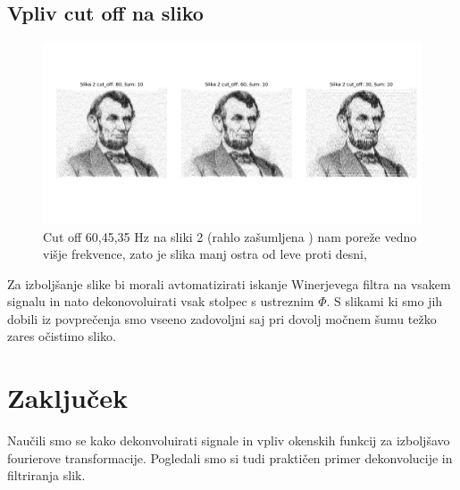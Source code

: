 \documentclass[11pt, a4paper]{article}
\begin{document}
\subsection{Vpliv cut off na sliko}
\begin{figure}[H]
\includegraphics[width=16cm, ]{tretja_tretji2.png}

\caption{Cut off {60,45,35 Hz} na sliki 2 (rahlo zašumljena ) nam poreže vedno višje frekvence, zato je slika manj ostra od leve proti desni, }  
\end{figure}
Za izboljšanje slike bi morali avtomatizirati iskanje Winerjevega filtra na vsakem signalu in nato dekonovoluirati vsak stolpec s ustreznim $\Phi$. S slikami ki smo jih dobili iz povprečenja smo vseeno zadovoljni saj pri dovolj močnem šumu težko zares očistimo sliko.

\section{Zaključek}
Naučili smo se kako dekonvoluirati signale in vpliv okenskih funkcij za izboljšavo fourierove transformacije. Pogledali smo si tudi praktičen primer dekonvolucije in filtriranja slik.
\end{document}
